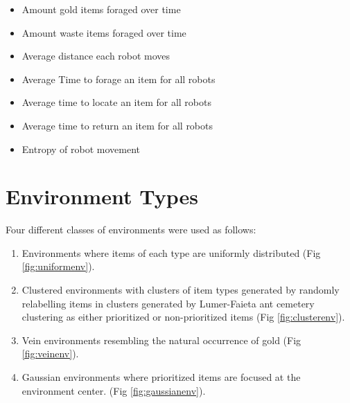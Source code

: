 	\begin{itemize}
		\item	Amount gold items foraged over time
		\item	Amount waste items foraged over time
		\item	Average distance each robot moves
		\item	Average Time to forage an item for all robots
		\item	Average time to locate an item for all robots
		\item	Average time to return an item for all robots
		\item	Entropy of robot movement
	\end{itemize}
	

\section{Environment Types}
\label{thri:third:environmenttypes}

Four different classes of environments were used as follows:
\begin{enumerate}
\item Environments where items of each type are uniformly distributed (Fig \ref{fig:uniformenv}).
\item Clustered environments with clusters of item types generated by randomly relabelling items in clusters generated by Lumer-Faieta ant cemetery clustering \cite{lumer1994diversity} as either prioritized or non-prioritized items (Fig \ref{fig:clusterenv}).
\item Vein environments resembling the natural occurrence of gold \cite{frimmel2002recent} (Fig \ref{fig:veinenv}).
\item Gaussian environments where prioritized items are focused at the environment center. (Fig \ref{fig:gaussianenv}). %
\end{enumerate} 

